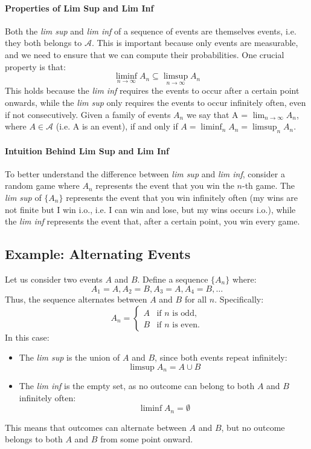     \paragraph{Properties of Lim Sup and Lim Inf}
    Both the \emph{lim sup} and \emph{lim inf} of a sequence of events are themselves events, i.e. they both belongs to $\mathcal{A}$. This is important because only events are measurable, and we need to ensure that we can compute their probabilities. \newline
    One crucial property is that:
    \[
    \liminf_{n \to \infty} A_n \subseteq \limsup_{n \to \infty} A_n
    \]
    This holds because the \emph{lim inf} requires the events to occur after a certain point onwards, while the \emph{lim sup} only requires the events to occur infinitely often, even if not consecutively.\newline
    Given a family of events $A_n$ we say that A = $\lim_{n \to \infty} A_n$, where $A \in \mathcal{A}$ (i.e. A is an event), if and only if $A = \liminf_n A_n = \limsup_n A_n$.
    
    \paragraph{Intuition Behind Lim Sup and Lim Inf}
    To better understand the difference between \emph{lim sup} and \emph{lim inf}, consider a random game where \( A_n \) represents the event that you win the \( n \)-th game. The \emph{lim sup} of \( \{A_n\} \) represents the event that you win infinitely often (my wins are not finite but I win i.o., i.e. I can win and lose, but my wins occurs i.o.), while the \emph{lim inf} represents the event that, after a certain point, you win every game.

    \subsection{Example: Alternating Events}
    Let us consider two events $A$ and $B$. Define a sequence $\{A_n\}$ where:
    \[
    A_1 = A, A_2 = B, A_3 = A, A_4 = B, \dots
    \]
    Thus, the sequence alternates between $A$ and $B$ for all $n$. Specifically:
    \[
    A_n = \begin{cases}
    A & \text{if } n \text{ is odd}, \\
    B & \text{if } n \text{ is even}.
    \end{cases}
    \]
    In this case:
    \begin{itemize}
        \item The \textit{lim sup} is the union of $A$ and $B$, since both events repeat infinitely:
        \[
        \limsup A_n = A \cup B
        \]
        \item The \textit{lim inf} is the empty set, as no outcome can belong to both $A$ and $B$ infinitely often:
        \[
        \liminf A_n = \emptyset
        \]
    \end{itemize}
    This means that outcomes can alternate between $A$ and $B$, but no outcome belongs to both $A$ and $B$ from some point onward.
    
